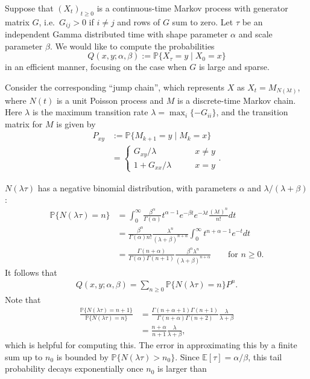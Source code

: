 \documentclass{article}
\newcommand{\E}{\mathbb{E}}
\renewcommand{\P}{\mathbb{P}}
\newcommand{\given}{\;\vert\;}
\begin{document}
Suppose that $(X_t)_{t\ge0}$ is a continuous-time Markov process with generator matrix $G$,
i.e.\ $G_{ij}>0$ if $i\neq j$ and rows of $G$ sum to zero.
Let $\tau$ be an independent Gamma distributed time with shape parameter $\alpha$ and scale parameter $\beta$.
We would like to compute the probabilities
\[
  Q(x,y;\alpha,\beta) := \P\{ X_\tau = y \given X_0 = x \} 
\]
in an efficient manner,
focusing on the case when $G$ is large and sparse.

Consider the corresponding ``jump chain'',
which represents $X$ as $X_t = M_{N(\lambda t)}$,
where $N(t)$ is a unit Poisson process and $M$ is a discrete-time Markov chain.
Here $\lambda$ is the maximum transition rate $\lambda = \max_i \{ - G_{ii} \}$,
and the transition matrix for $M$ is given by
\begin{align}
    P_{xy} &:= \P\{M_{k+1} = y \given M_k = x\} \\
        &= \begin{cases}  
                G_{xy}/\lambda \qquad & x\neq y \\
                1+G_{xx}/\lambda \qquad & x=y 
            \end{cases} .
\end{align}

$N(\lambda \tau)$ has a negative binomial distribution, with parameters $\alpha$ and $\lambda/(\lambda+\beta)$:
\begin{align}
  \P\{ N(\lambda \tau) = n \} &= \int_0^\infty \frac{ \beta^\alpha }{\Gamma(\alpha)} t^{\alpha-1} e^{-\beta t} e^{-\lambda t} \frac{ (\lambda t)^n }{ n! } dt \\
  &= \frac{ \beta^\alpha }{ \Gamma(\alpha) n! } \frac{\lambda^n}{(\lambda+\beta)^{n+\alpha}} \int_0^\infty t^{n+\alpha-1} e^{-t} dt \\
  &= \frac{ \Gamma(n+\alpha) }{ \Gamma(\alpha) \Gamma(n+1) } \frac{ \beta^\alpha \lambda^n }{(\lambda+\beta)^{n+\alpha}}\qquad \text{for } n \ge 0 .
\end{align}
It follows that
\begin{align}
    Q(x,y;\alpha,\beta) = \sum_{n \ge 0} \P\{ N(\lambda \tau) = n \} P^n  .
\end{align}
Note that 
\begin{align}
  \frac{ \P\{ N(\lambda \tau) = n+1 \} }{ \P\{ N(\lambda \tau) = n \} } &= \frac{ \Gamma(n+\alpha+1) \Gamma(n+1) }{ \Gamma(n+\alpha) \Gamma(n+2) } \frac{\lambda}{\lambda+\beta} \\
  &= \frac{ n+\alpha }{ n+1 } \frac{\lambda}{\lambda+\beta} ,
\end{align}
which is helpful for computing this.
The error in approximating this by a finite sum up to $n_0$ is bounded by $\P\{N(\lambda \tau)>n_0\}$.
Since $\E[\tau] = \alpha/\beta$, this tail probability decays exponentially once $n_0$ is larger than 
\end{document}
